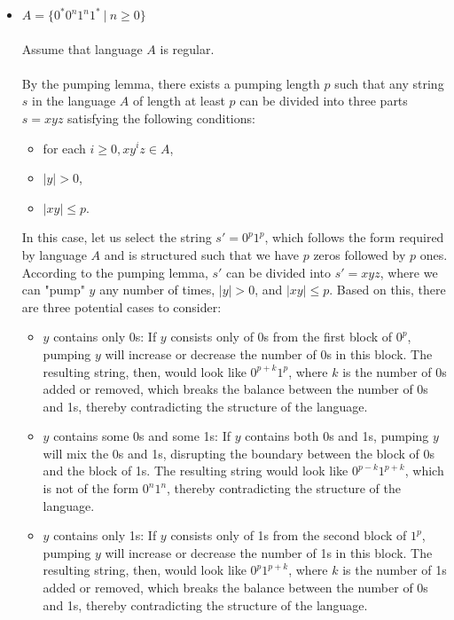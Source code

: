 \documentclass[12pt]{article}
\begin{document}
\begin{itemize}
	\item $A= \{ 0^*0^n1^n1^* \ | \ n \geq 0\}$\\
\\
Assume that language $A$ is regular.\\
\\
By the pumping lemma, there exists a pumping length $p$ such that any string $s$ in the language $A$ of length at least $p$ can be divided into three parts $s = xyz$ satisfying the following conditions:
\begin{itemize}
    \item for each $i \geq 0, xy^iz \in A$,
    \item $|y| > 0$,
    \item $|xy| \leq p$.
\end{itemize}

In this case, let us select the string $s' = 0^p1^p$, which follows the form required by language $A$ and is structured such that we have $p$ zeros followed by $p$ ones.\\

According to the pumping lemma, $s'$ can be divided into $s' = xyz$, where we can "pump" $y$ any number of times, $|y| > 0$, and $|xy| \leq p$. Based on this, there are three potential cases to consider:

\begin{itemize}
    \item $y$ contains only 0s: If $y$ consists only of 0s from the first block of $0^p$, pumping $y$ will increase or decrease the number of 0s in this block. The resulting string, then, would look like $0^{p+k}1^p$, where $k$ is the number of 0s added or removed, which breaks the balance between the number of 0s and 1s, thereby contradicting the structure of the language.
    
    \item $y$ contains some 0s and some 1s: If $y$ contains both 0s and 1s, pumping $y$ will mix the 0s and 1s, disrupting the boundary between the block of 0s and the block of 1s. The resulting string would look like $0^{p-k}1^{p+k}$, which is not of the form $0^n1^n$, thereby contradicting the structure of the language.
    
    \item $y$ contains only 1s: If $y$ consists only of 1s from the second block of $1^p$, pumping $y$ will increase or decrease the number of 1s in this block. The resulting string, then, would look like $0^p1^{p+k}$, where $k$ is the number of 1s added or removed, which breaks the balance between the number of 0s and 1s, thereby contradicting the structure of the language.
\end{itemize}


\end{itemize}
\end{document}
